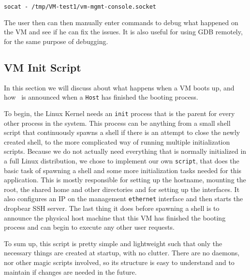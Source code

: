 \lstset{label=lst:socat-serial-example}
\begin{lstlisting}
socat - /tmp/VM-test1/vm-mgmt-console.socket
\end{lstlisting}

The user then can then manually enter commands to debug what happened on the VM and see if he can fix the issues.
It is also useful for using GDB remotely, for the same purpose of debugging.

\subsection{VM Init Script}
\label{sub-sec:vm-init-script}

In this section we will discuss about what happens when a VM boots up, and how \project\ is announced when a \texttt{Host} has finished the booting process.

To begin, the Linux Kernel needs an \texttt{init} process that is the parent for every other process in the system.
This process can be anything from a small shell script that continuously spawns a shell if there is an attempt to close the newly created shell, to the more complicated way of running multiple initialization scripts.
Because we do not actually need everything that is normally initialized in a full Linux distribution, we chose to implement our own \texttt{script}, that does the basic task of spawning a shell and some more initialization tasks needed for this application.
This is mostly responsible for setting up the hostname, mounting the root, the shared home and other directories and for setting up the interfaces.
It also configures an IP on the management \texttt{ethernet} interface and then starts the dropbear SSH server.
The last thing it does before spawning a shell is to announce the physical host machine that this VM has finished the booting process and can begin to execute any other user requests.

To sum up, this script is pretty simple and lightweight such that only the necessary things are created at startup, with no clutter.
There are no daemons, nor other magic scripts involved, so its structure is easy to understand and to maintain if changes are needed in the future.
